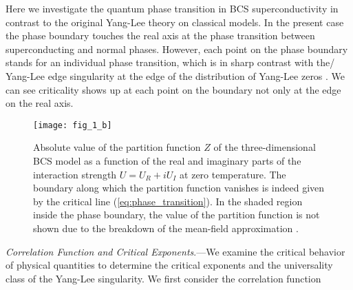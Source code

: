 \documentclass[aps,prl,twocolumn,nofootinbib,superscriptaddress,notitlepage,longbibliography]{revtex4-1}
\begin{document}
	Here we investigate the quantum phase transition in BCS superconductivity in contrast to the original Yang-Lee theory \cite{PhysRev.87.404,PhysRev.87.410} on classical models. In the present case the phase boundary touches the real axis at the phase transition between superconducting and normal phases. However, each point on the phase boundary stands for an individual phase transition, which is in sharp contrast with the/ Yang-Lee edge singularity at the edge of the distribution of Yang-Lee zeros \cite{Fisher:1978vn}. We can see criticality shows up at each point on the boundary not only at the edge on the real axis.
	
	\begin{figure}
	\texttt{[image: fig\_1\_b]}
	
	\caption{Absolute value of the partition function $Z$ of the three-dimensional  BCS model as a function of the real and imaginary parts of the interaction strength $U=U_{R}+iU_{I}$ at zero temperature. The boundary along which the partition function vanishes is indeed given by the critical line (\ref{eq:phase_transition}). In the shaded region inside the phase boundary, the value of the partition function is not shown due to the breakdown of the mean-field approximation \cite{Yamamoto2019}.} 
	
	\label{Phase_transition_line}
	\end{figure}
	
	\emph{Correlation Function and Critical Exponents}.---We examine the critical behavior of physical quantities to determine the critical exponents and the universality class of the Yang-Lee singularity. We first consider the correlation function
	
\end{document}
